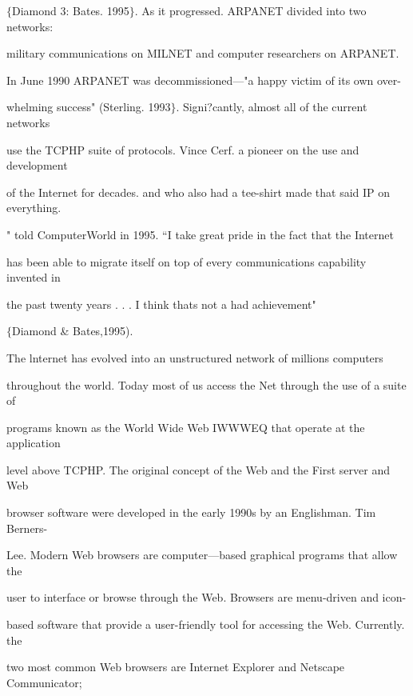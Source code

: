 \documentclass{book}
\begin{document}
\noindent \begin{flushleft}
$\mathrm{\{}$Diamond 3: Bates. 1995$\mathrm{\}}$. As it progressed. ARPANET divided into two networks:

\noindent military communications on MILNET and computer researchers on ARPANET.

\noindent 

\noindent      In June 1990 ARPANET was decommissioned---"a happy victim of its own over-

\noindent whelming success" (Sterling. 1993$\mathrm{\}}$. Signi?cantly, almost all of the current networks

\noindent use the TCPHP suite of protocols. Vince Cerf. a pioneer on the use and development

\noindent of the Internet for decades. and who also had a tee-shirt made that said IP on everything.

\noindent " told ComputerWorld in 1995. ``I take great pride in the fact that the Internet

\noindent has been able to migrate itself on top of every communications capability invented in

\noindent the past twenty years . . . I think thats not a had achievement"

\noindent  $\mathrm{\{}$Diamond \& Bates,1995).

\noindent 

\noindent The lnternet has evolved into an unstructured network of millions computers

\noindent throughout the world. Today most of us access the Net through the use of a suite of

\noindent programs known as the World Wide Web IWWWEQ that operate at the application

\noindent level above TCPHP. The original concept of the Web and the First server and Web

\noindent browser software were developed in the early 1990s by an Englishman. Tim Berners-

\noindent Lee. Modern Web browsers are computer---based graphical programs that allow the

\noindent user to interface or browse through the Web. Browsers are menu-driven and icon-

\noindent based software that provide a user-friendly tool for accessing the Web. Currently. the

\noindent two most common Web browsers are Internet Explorer and Netscape Communicator;


\end{flushleft}
\end{document}
